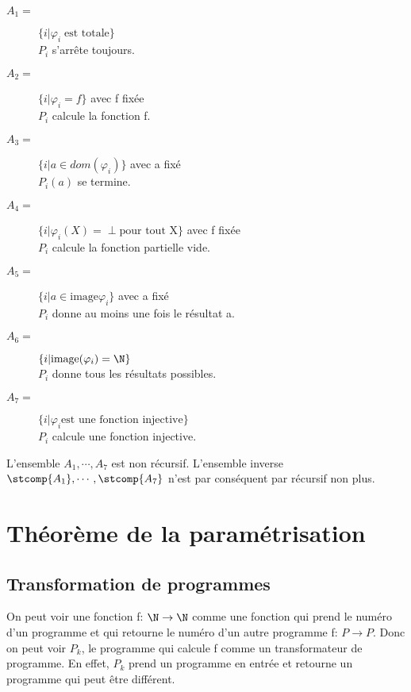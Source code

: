 \begin{description}
	\item[$A_1 =$] $\{i| \varphi_i \; \text{est totale}\}$ \\
	 				$P_i$ s'arrête toujours.
	\item[$A_2 =$] $\{i| \varphi_i = f\}$ avec f fixée \\
					$P_i$ calcule la fonction f.
	\item[$A_3 =$] $\{i| a \in dom(\varphi_i)\}$ avec a fixé \\
					$P_i(a)$ se termine.
	\item[$A_4 =$] $\{i| \varphi_i(X) = \perp \text{pour tout X}\}$ avec f fixée \\
					$P_i$ calcule la fonction partielle vide.
	\item[$A_5 =$] $\{i| a \in \text{image}\varphi_i\}$ avec a fixé \\
					$P_i$ donne au moins une fois le résultat a.
	\item[$A_6 =$] $\{i| \text{image}(\varphi_i) = \N\}$ \\
					$P_i$ donne tous les résultats possibles.
	\item[$A_7 =$] $\{i| \varphi_i \text{est une fonction injective}\}$ \\
					$P_i$ calcule une fonction injective.
\end{description}

L'ensemble $A_1, \cdots, A_7$ est non récursif. L'ensemble inverse $\stcomp{A_1}, \cdots, \stcomp{A_7}$ n'est par conséquent par récursif non plus.


\section{Théorème de la paramétrisation}
\label{sec:th_or_me_de_la_param_trisation}

\subsection{Transformation de programmes}
\label{sub:transformation_de_programmes}
\begin{mydef}
	On peut voir une fonction f: $\N \rightarrow \N$ comme une fonction qui prend
	le numéro d'un programme et qui retourne le numéro d'un autre programme f: $P
	\rightarrow P$. Donc on peut voir $P_k$, le programme qui calcule f comme un
	transformateur de programme. En effet, $P_k$ prend un programme en entrée et
	retourne un programme qui peut être différent.
\end{mydef}


